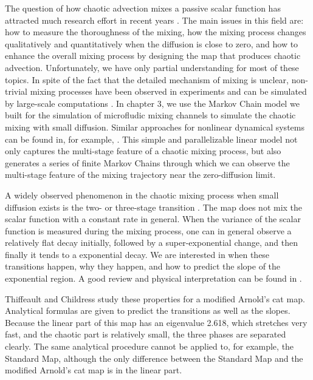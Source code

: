 % 
The question of how chaotic advection mixes a passive scalar function
has attracted much research effort in recent years
\cite{Ottino2004}. The main issues in this field are: how to measure
the thoroughness of the mixing, how the mixing process changes
qualitatively and quantitatively when the diffusion is close to zero,
and how to enhance the overall mixing process by designing the map
that produces chaotic advection. Unfortunately, we have only partial
understanding for most of these topics. In spite of the fact that the
detailed mechanism of mixing is unclear, non-trivial mixing processes
have been observed in experiments \cite{Rothstein1999, Voth2002} and
can be simulated by large-scale computations \cite{topopt,
  Tsang2005}. 
In chapter 3, we use the Markov Chain model we built for the simulation of microfludic mixing channels to simulate the chaotic mixing with small diffusion. Similar approaches for nonlinear dynamical systems can be found in, for example,
\cite{Dellnitz1999, Dellnitz2002, Froyland1998, Froyland1999,
  Froyland2001}. This simple and parallelizable linear model not only
captures the multi-stage feature of a chaotic mixing process, but also
generates a series of finite Markov Chains through which we can
observe the multi-stage feature of the mixing trajectory near the
zero-diffusion limit.



A widely observed phenomenon in the chaotic mixing process when small
diffusion exists is the two- or three-stage transition
\cite{Thiffeault2003-13, Fereday2002, Antonsen1996, Mezic2005}. The
map does not mix the scalar function with a constant rate in
general. When the variance of the scalar function is measured during
the mixing process, one can in general observe a relatively flat decay
initially, followed by a super-exponential change, and then finally it
tends to a exponential decay. We are interested in when these
transitions happen, why they happen, and how to predict the slope of
the exponential region. A good review and physical interpretation can
be found in \cite{Thiffeault2004}.

Thiffeault and Childress \cite{Thiffeault2003-13} study these
properties for a modified Arnold's cat map. Analytical formulas are
given to predict the transitions as well as the slopes. Because the
linear part of this map has an eigenvalue 2.618, which stretches very fast, 
and the chaotic part is relatively small, the three phases are
separated clearly. The same analytical procedure cannot be applied to,
for example, the Standard Map, although the only difference between the
Standard Map and the modified Arnold's cat map is in the linear part.

